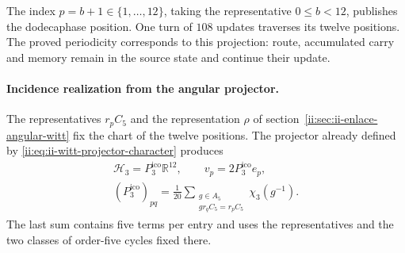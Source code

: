 The index \(p=b+1\in\{1,\ldots,12\}\), taking the representative
\(0\le b<12\), publishes the dodecaphase position. One turn of
\(108\) updates traverses its twelve positions. The proved periodicity
corresponds to this projection: route, accumulated carry and
memory remain in the source state and continue their update.

\paragraph{Incidence realization from the angular projector.}
The representatives \(r_pC_5\) and the representation \(\rho\) of
section~\ref{ii:sec:ii-enlace-angular-witt} fix the chart of the twelve
positions. The projector already defined by
\eqref{ii:eq:ii-witt-projector-character} produces
\begin{equation}
 \begin{gathered}
 \mathcal H_3=P_3^{\mathrm{ico}}\mathbb R^{12},\qquad v_p=2P_3^{\mathrm{ico}}e_p,
 \\[-2pt]
 (P_3^{\mathrm{ico}})_{pq}=\frac1{20}
 \sum_{\substack{g\in A_5\\gr_qC_5=r_pC_5}}\chi_3(g^{-1}).
 \end{gathered}
 \label{ii:ii:dodeca:vertices-proyector}
\end{equation}
The last sum contains five terms per entry and uses the
representatives and the two classes of order-five cycles fixed there.

